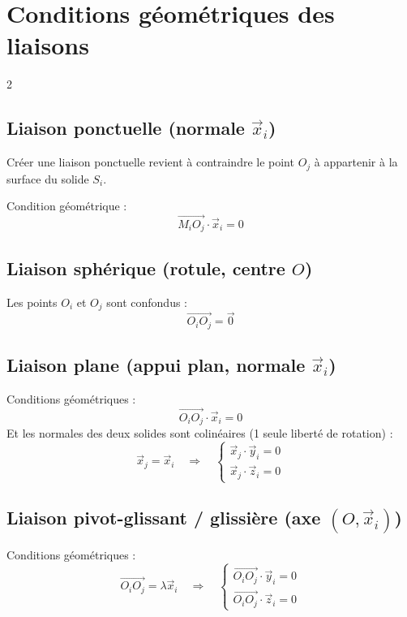 \documentclass[10pt,a4paper]{article}
\renewcommand{\vec}{\overrightarrow}
\begin{document}
\section{Conditions géométriques des liaisons}
 \begin{multicols}{2}

    \subsection{Liaison ponctuelle (normale $\vec x_i$)}
        Créer une liaison ponctuelle revient à contraindre le point $O_j$ à
        appartenir à la surface du solide $S_i$.

        Condition géométrique :
        \[
        \vec{M_iO_j} \cdot \vec x_i = 0
        \]


    \subsection{Liaison sphérique (rotule, centre $O$)}
        Les points $O_i$ et $O_j$ sont confondus :
        \[
        \vec{O_iO_j} = \vec 0
        \]


    \subsection{Liaison plane (appui plan, normale $\vec x_i$)}

        Conditions géométriques :
        \[
        \vec{O_iO_j} \cdot \vec x_i = 0
        \]
        Et les normales des deux solides sont colinéaires (1 seule liberté de rotation) :
        \[
        \vec x_j = \vec x_i
        \quad \Rightarrow \quad
        \begin{cases}
        \vec x_j \cdot \vec y_i = 0 \\
        \vec x_j \cdot \vec z_i = 0
        \end{cases}
        \]


    \subsection{Liaison pivot-glissant / glissière (axe $(O,\vec x_i)$)}

        Conditions géométriques :
        \[
        \vec{O_iO_j} = \lambda \vec x_i
        \quad \Rightarrow \quad
        \begin{cases}
        \vec{O_iO_j} \cdot \vec y_i = 0 \\
        \vec{O_iO_j} \cdot \vec z_i = 0
        \end{cases}
        \]


\end{multicols}
\end{document}
